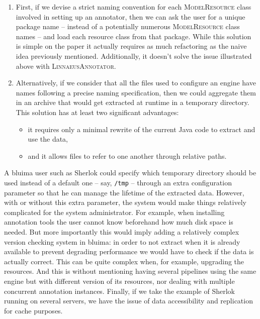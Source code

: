 \documentclass{article}
\newcommand{\id}[1]{\mbox{\textsc{#1}}}
\newcommand{\path}[1]{\mbox{\texttt{#1}}}
\begin{document}
\begin{enumerate}

\item First, if we devise a strict naming convention for each \id{ModelResource} class involved in setting up an annotator, then we can ask the user for a unique package name -- instead of a potentially numerous \id{ModelResource} class names -- and load each resource class from that package. While this solution is simple on the paper it actually requires as much refactoring as the naive idea previously mentioned. Additionally, it doesn't solve the issue illustrated above with \id{LinnaeusAnnotator}.

\item Alternatively, if we consider that all the files used to configure an engine have names following a precise naming specification, then we could aggregate them in an archive that would get extracted at runtime in a temporary directory. This solution has at least two significant advantages:

\begin{itemize}

\item it requires only a minimal rewrite of the current Java code to extract and use the data,

\item and it allows files to refer to one another through relative paths.

\end{itemize}

\end{enumerate}

A bluima user such as Sherlok could specify which temporary directory should be used instead of a default one -- say, \path{/tmp} -- through an extra configuration parameter so that he can manage the lifetime of the extracted data. However, with or without this extra parameter, the system would make things relatively complicated for the system administrator. For example, when installing annotation tools the user cannot know beforehand how much disk space is needed. But more importantly this would imply adding a relatively complex version checking system in bluima: in order to not extract when it is already available to prevent degrading performance we would have to check if the data is actually correct. This can be quite complex when, for example, upgrading the resources. And this is without mentioning having several pipelines using the same engine but with different version of its resources, nor dealing with multiple concurrent annotation instances. Finally, if we take the example of Sherlok running on several servers, we have the issue of data accessibility and replication for cache purposes.
\end{document}
